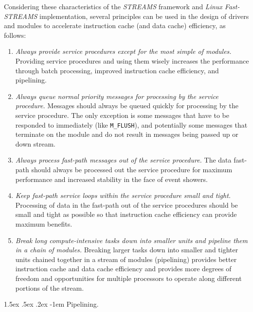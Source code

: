 \documentclass[letterpaper,final,notitlepage,twocolumn,10pt,twoside]{article}
\makeatletter
\let\normalsize = \small
\let\small = \footnotesize
\let\footnotesize = \scriptsize
\let\scriptsize = \tiny
\renewcommand\paragraph{\@startsection{paragraph}{4}{\z@}%
                                    {1.5ex \@plus .5ex \@minus .2ex}%
                                    {-1em}%
                                    {\normalfont\normalsize\bfseries\slshape}}
\makeatother
\begin{document}
Considering these characteristics of the {\sl STREAMS} framework and {\sl Linux
Fast-STREAMS} implementation, several principles can be used in the design of
drivers and modules to accelerate instruction cache (and data cache) efficiency,
as follows:

\begin{enumerate}

\item {\it Always provide service procedures except for the most simple of
modules.}
Providing service procedures and using them wisely increases the performance
through batch processing, improved instruction cache efficiency, and pipelining.

\item {\it Always queue normal priority messages for processing by the service
procedure.}
Messages should always be queued quickly for processing by the service
procedure.  The only exception is some messages that have to be responded to
immediately (like {\tt M\_FLUSH}), and potentially some messages that terminate
on the module and do not result in messages being passed up or down stream.

\item {\it Always process fast-path messages out of the service procedure.}
The data fast-path should always be processed out the service procedure for
maximum performance and increased stability in the face of event showers.

\item {\it Keep fast-path service loops within the service procedure small and
tight.}
Processing of data in the fast-path out of the service procedures should be
small and tight as possible so that instruction cache efficiency can provide
maximum benefits.

\item {\it Break long compute-intensive tasks down into smaller units and
pipeline them in a chain of modules.}
Breaking larger tasks down into smaller and tighter units chained together in a
stream of modules (pipelining) provides better instruction cache and data cache
efficiency and provides more degrees of freedom and opportunities for multiple
processors to operate along different portions of the stream.

\end{enumerate}

\paragraph{Pipelining.}
\label{section:pipelining}
\end{document}
